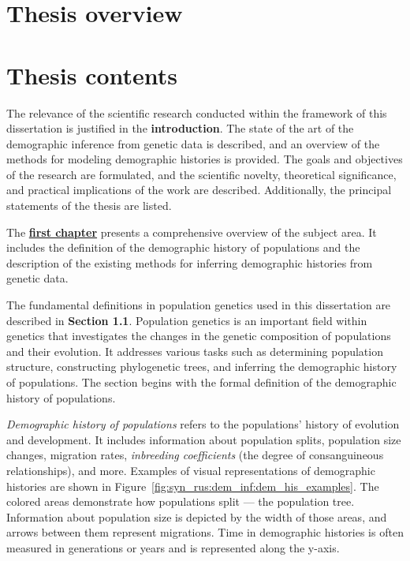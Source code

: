
\section*{Thesis overview}



\newpage
\section*{Thesis contents}

The relevance of the scientific research conducted within the framework of this dissertation is justified in the \textbf{introduction}.
The state of the art of the demographic inference from genetic data is described, and an overview of the methods for modeling demographic histories is provided.
The goals and objectives of the research are formulated, and the scientific novelty, theoretical significance, and practical implications of the work are described.
Additionally, the principal statements of the thesis are listed.

The \underline{\textbf{first chapter}} presents a comprehensive overview of the subject area.
It includes the definition of the demographic history of populations and the description of the existing methods for inferring demographic histories from genetic data.

The fundamental definitions in population genetics used in this dissertation are described in \textbf{Section 1.1}.
Population genetics is an important field within genetics that investigates the changes in the genetic composition of populations and their evolution.
It addresses various tasks such as determining population structure, constructing phylogenetic trees, and inferring the demographic history of populations.
The section begins with the formal definition of the demographic history of populations.

\emph{Demographic history of populations} refers to the populations' history of evolution and development.
It includes information about population splits, population size changes, migration rates, \textit{inbreeding coefficients} (the degree of consanguineous relationships), and more.
Examples of visual representations of demographic histories are shown in Figure~\ref{fig:syn_rus:dem_inf:dem_his_examples}. 
The colored areas demonstrate how populations split --- the population tree.
Information about population size is depicted by the width of those areas, and arrows between them represent migrations.
Time in demographic histories is often measured in generations or years and is represented along the y-axis.

